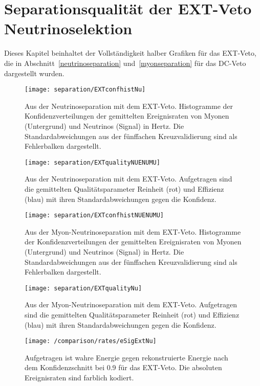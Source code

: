 \section{Separationsqualität der EXT-Veto Neutrinoselektion}
\label{extvetoAnhang}
Dieses Kapitel beinhaltet der Vollständigkeit halber Grafiken für das EXT-Veto, die in Abschnitt~\ref{neutrinoseparation} und~\ref{myonseparation} für das DC-Veto dargestellt wurden.
\begin{figure}
\begin{center}
    \texttt{[image: separation/EXTconfhistNu]}
\end{center}
\vspace{-2em}
\caption{Aus der Neutrinoseparation mit dem EXT-Veto. Histogramme der Konfidenzverteilungen der gemittelten Ereignisraten von Myonen (Untergrund) und Neutrinos (Signal) in Hertz. Die Standardabweichungen aus der fünffachen Kreuzvalidierung sind als Fehlerbalken dargestellt. }
\end{figure}
\begin{figure}
\begin{center}
    \texttt{[image: separation/EXTqualityNUENUMU]}
\end{center}
\vspace{-2em}
\caption{Aus der Neutrinoseparation mit dem EXT-Veto. Aufgetragen sind die gemittelten Qualitätsparameter Reinheit (rot) und Effizienz (blau) mit ihren Standardabweichungen gegen die Konfidenz.}
\end{figure}
\begin{figure}
\begin{center}
    \texttt{[image: separation/EXTconfhistNUENUMU]}
\end{center}
\vspace{-2em}
\caption{Aus der Myon-Neutrinoseparation mit dem EXT-Veto. Histogramme der Konfidenzverteilungen der gemittelten Ereignisraten von Myonen (Untergrund) und Neutrinos (Signal) in Hertz. Die Standardabweichungen aus der fünffachen Kreuzvalidierung sind als Fehlerbalken dargestellt. }
\end{figure}
\begin{figure}
\begin{center}
    \texttt{[image: separation/EXTqualityNu]}
\end{center}
\vspace{-2em}
\caption{Aus der Myon-Neutrinoseparation mit dem EXT-Veto. Aufgetragen sind die gemittelten Qualitätsparameter Reinheit (rot) und Effizienz (blau) mit ihren Standardabweichungen gegen die Konfidenz.}
\end{figure}

\begin{figure}
\begin{center}
    \texttt{[image: /comparison/rates/eSigExtNu]}
\end{center}
\vspace{-2em}
    \caption{Aufgetragen ist wahre Energie gegen rekonstruierte Energie nach dem Konfidenzschnitt bei 0.9 für das EXT-Veto. Die absoluten Ereignisraten sind farblich kodiert.}
\label{fig:eNUEXT}
\end{figure}

